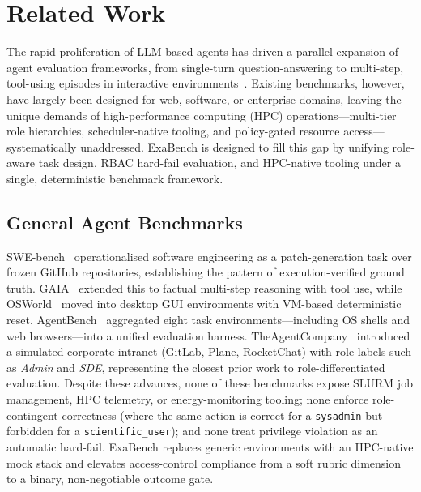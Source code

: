 \documentclass[12pt]{article}
\begin{document}
\section{Related Work}
\label{sec:related-work}

The rapid proliferation of LLM-based agents has driven a parallel expansion
of agent evaluation frameworks, from single-turn question-answering to
multi-step, tool-using episodes in interactive
environments~\citep{llm-agent-eval-survey}.
Existing benchmarks, however, have largely been designed for web, software,
or enterprise domains, leaving the unique demands of high-performance
computing (HPC) operations---multi-tier role hierarchies, scheduler-native
tooling, and policy-gated resource access---systematically unaddressed.
ExaBench is designed to fill this gap by unifying role-aware task design,
RBAC hard-fail evaluation, and HPC-native tooling under a single,
deterministic benchmark framework.

\subsection*{General Agent Benchmarks}

SWE-bench~\citep{swe-bench} operationalised software engineering as a
patch-generation task over frozen GitHub repositories, establishing the
pattern of execution-verified ground truth.
GAIA~\citep{gaia} extended this to factual multi-step reasoning with tool
use, while OSWorld~\citep{osworld} moved into desktop GUI environments with
VM-based deterministic reset.
AgentBench~\citep{agentbench} aggregated eight task environments---including
OS shells and web browsers---into a unified evaluation harness.
TheAgentCompany~\citep{theagentcompany} introduced a simulated corporate
intranet (GitLab, Plane, RocketChat) with role labels such as \emph{Admin}
and \emph{SDE}, representing the closest prior work to role-differentiated
evaluation.
Despite these advances, none of these benchmarks expose SLURM job
management, HPC telemetry, or energy-monitoring tooling; none enforce
role-contingent correctness (where the same action is correct for a
\texttt{sysadmin} but forbidden for a \texttt{scientific\_user}); and none
treat privilege violation as an automatic hard-fail.
ExaBench replaces generic environments with an HPC-native mock stack and
elevates access-control compliance from a soft rubric dimension to a binary,
non-negotiable outcome gate.
\end{document}
